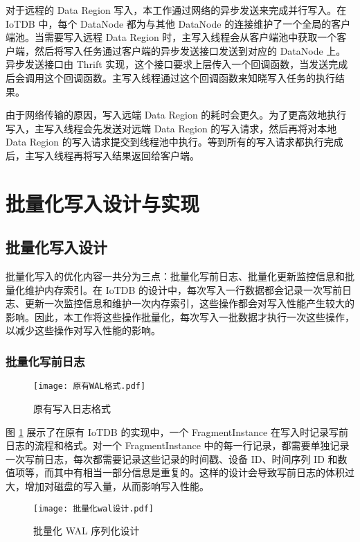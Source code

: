 对于远程的 Data Region 写入，本工作通过网络的异步发送来完成并行写入。在 IoTDB 中，每个 DataNode 都为与其他 DataNode 的连接维护了一个全局的客户端池。当需要写入远程 Data Region 时，主写入线程会从客户端池中获取一个客户端，然后将写入任务通过客户端的异步发送接口发送到对应的 DataNode 上。异步发送接口由 Thrift 实现，这个接口要求上层传入一个回调函数，当发送完成后会调用这个回调函数。主写入线程通过这个回调函数来知晓写入任务的执行结果。

由于网络传输的原因，写入远端 Data Region 的耗时会更久。为了更高效地执行写入，主写入线程会先发送对远端 Data Region 的写入请求，然后再将对本地 Data Region 的写入请求提交到线程池中执行。等到所有的写入请求都执行完成后，主写入线程再将写入结果返回给客户端。

\section{批量化写入设计与实现}
\subsection{批量化写入设计}
批量化写入的优化内容一共分为三点：批量化写前日志、批量化更新监控信息和批量化维护内存索引。在 IoTDB 的设计中，每次写入一行数据都会记录一次写前日志、更新一次监控信息和维护一次内存索引，这些操作都会对写入性能产生较大的影响。因此，本工作将这些操作批量化，每次写入一批数据才执行一次这些操作，以减少这些操作对写入性能的影响。

\subsubsection{批量化写前日志}
\begin{figure}
  \centering
  \texttt{[image: 原有WAL格式.pdf]}
  \caption{原有写入日志格式}
  \label{fig:origin-wal-format}
\end{figure}

图 \ref{fig:origin-wal-format} 展示了在原有 IoTDB 的实现中，一个 FragmentInstance 在写入时记录写前日志的流程和格式。对一个 FragmentInstance 中的每一行记录，都需要单独记录一次写前日志，每次都需要记录这些记录的时间戳、设备 ID、时间序列 ID 和数值项等，而其中有相当一部分信息是重复的。这样的设计会导致写前日志的体积过大，增加对磁盘的写入量，从而影响写入性能。

\begin{figure}
  \centering
  \texttt{[image: 批量化wal设计.pdf]}
  \caption{批量化 WAL 序列化设计}
  \label{fig:batch-wal-design}
\end{figure}

